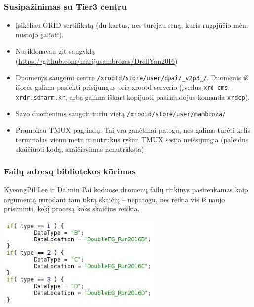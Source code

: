 \documentclass{beamer}
\begin{document}
\begin{frame}
\frametitle{Susipažinimas su Tier3 centru}

\begin{itemize}
	\item Įsikėliau GRID sertifikatą (du kartus, nes turėjau seną, kuris rugpjūčio mėn. nustojo galioti).
	\item Nusiklonavau git saugyklą (\url{https://github.com/marijusambrozas/DrellYan2016})
	\item Duomenys saugomi centre \texttt{/xrootd/store/user/dpai/\_v2p3\_/}. Duomenis iš išorės galima pasiekti prisijungus prie xrootd serverio (įvedus \texttt{xrd cms-xrdr.sdfarm.kr}, arba galima iškart kopijuoti pasinaudojus komanda \texttt{xrdcp}).
	\item Savo duomenims saugoti turiu vietą \texttt{/xrootd/store/user/mambroza/}
	\item Pramokau TMUX pagrindų. Tai yra ganėtinai patogu, nes galima turėti kelis terminalus vienu metu ir nutrūkus ryšiui TMUX sesija neišsijungia (paleidus skaičiuoti kodą, skaičiavimas nenutrūksta).
\end{itemize}

\end{frame}


\begin{frame}[allowframebreaks]
\frametitle{Failų adresų bibliotekos kūrimas}

KyeongPil Lee ir Dalmin Pai koduose duomenų failų rinkinys pasirenkamas kaip argumentą nurodant tam tikrą skaičių -- nepatogu, nes reikia vis iš naujo prisiminti, kokį procesą koks skaičius reiškia.

\begin{center}
	\includegraphics[width=0.6\textwidth]{oldAddress.JPG}
\end{center}
	
\end{frame}
\end{document}

